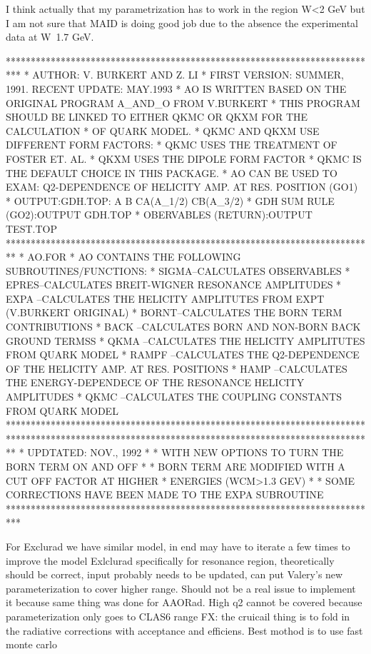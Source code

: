 I think actually that my parametrization has to work in the region W<2 GeV but I am not sure that MAID is doing good job due to the absence the experimental data at W~1.7 GeV. 

***************************************************************************
*      AUTHOR:        V. BURKERT AND Z. LI
*      FIRST VERSION: SUMMER, 1991.  RECENT UPDATE: MAY.1993
* AO IS WRITTEN BASED ON THE ORIGINAL PROGRAM A_AND_O FROM V.BURKERT
* THIS PROGRAM SHOULD BE LINKED TO EITHER QKMC OR QKXM FOR THE CALCULATION
* OF QUARK MODEL.  
* QKMC AND QKXM USE DIFFERENT FORM FACTORS:
* QKMC USES THE TREATMENT OF FOSTER ET. AL.
* QKXM USES THE DIPOLE FORM FACTOR 
* QKMC IS THE DEFAULT CHOICE IN THIS PACKAGE.
* AO CAN BE USED TO EXAM: Q2-DEPENDENCE OF HELICITY AMP. AT RES. POSITION (GO1)
*                         OUTPUT:GDH.TOP: A B CA(A_1/2) CB(A_3/2)
*                         GDH SUM RULE (GO2):OUTPUT GDH.TOP
*                         OBERVABLES  (RETURN):OUTPUT TEST.TOP
**************************************************************************
*           AO.FOR
* AO CONTAINS THE FOLLOWING SUBROUTINES/FUNCTIONS:
* SIGMA--CALCULATES OBSERVABLES
* EPRES--CALCULATES BREIT-WIGNER RESONANCE AMPLITUDES
* EXPA --CALCULATES THE HELICITY AMPLITUTES FROM EXPT (V.BURKERT ORIGINAL)
* BORNT--CALCULATES THE BORN TERM CONTRIBUTIONS
* BACK --CALCULATES BORN AND NON-BORN BACK GROUND TERMSS
* QKMA --CALCULATES THE HELICITY AMPLITUTES FROM QUARK MODEL
* RAMPF --CALCULATES THE Q2-DEPENDENCE OF THE HELICITY AMP. AT RES. POSITIONS
* HAMP --CALCULATES THE ENERGY-DEPENDECE OF THE RESONANCE HELICITY AMPLITUDES
* QKMC --CALCULATES THE COUPLING CONSTANTS FROM QUARK MODEL
************************************************************************
**************************************************************************
* UPDTATED: NOV., 1992
*         * WITH NEW OPTIONS TO TURN THE BORN TERM ON AND OFF
*         * BORN TERM ARE MODIFIED WITH A CUT OFF FACTOR AT HIGHER 
*           ENERGIES (WCM>1.3 GEV)
*         * SOME CORRECTIONS HAVE BEEN MADE TO THE EXPA SUBROUTINE
***************************************************************************  

    For Exclurad we have similar model, in end may have to iterate a few times to improve the model
    Exlclurad specifically for resonance region, theoretically should be correct, input probably needs to be updated, can put Valery’s new parameterization to cover higher range. Should not be a real issue to implement it because same thing was done for AAORad. High q2 cannot be covered because parameterization only goes to CLAS6 range
    FX: the cruicail thing is to fold in the radiative corrections with acceptance and efficiens. Best mothod is to use fast monte carlo


